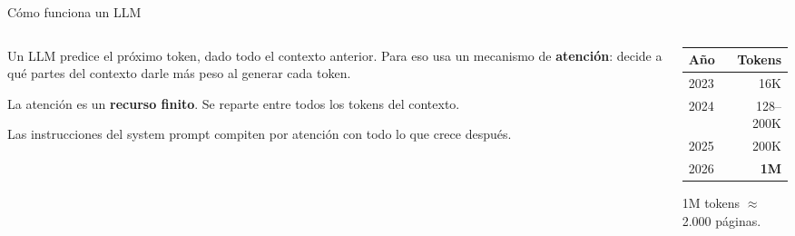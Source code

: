 \documentclass[aspectratio=169, 11pt]{beamer}
\begin{document}
\begin{frame}{C\'omo funciona un LLM}

\begin{columns}[T]
\begin{column}{0.55\textwidth}
Un LLM predice el pr\'oximo token, dado todo el contexto anterior.
Para eso usa un mecanismo de \textbf{atenci\'on}: decide a qu\'e partes del contexto darle m\'as peso al generar cada token.

\vspace{0.8em}

La atenci\'on es un \textbf{recurso finito}. Se reparte entre todos los tokens del contexto.

\vspace{0.8em}

Las instrucciones del system prompt compiten por atenci\'on con todo lo que crece despu\'es.
\end{column}

\begin{column}{0.42\textwidth}
\renewcommand{\arraystretch}{1.4}
\begin{tabular}{@{} l r @{}}
\toprule
\textbf{A\~no} & \textbf{Tokens} \\
\midrule
2023 & 16K \\
2024 & 128--200K \\
2025 & 200K \\
2026 & \alert{\textbf{1M}} \\
\bottomrule
\end{tabular}

\vspace{0.6em}
\footnotesize
1M tokens $\approx$ 2.000 p\'aginas.
\end{column}
\end{columns}

\end{frame}
\end{document}

